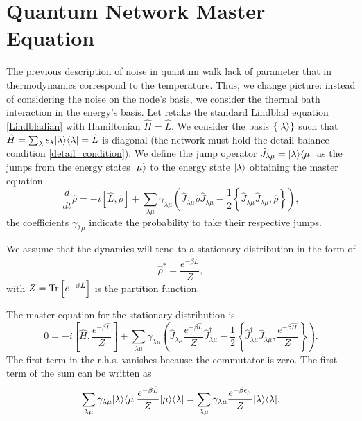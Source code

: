 \section{Quantum Network Master Equation}

The previous description of noise in quantum walk lack of parameter that in thermodynamics correspond to the temperature. 
Thus, we change picture: instead of considering the noise on the node's basis, we consider the thermal bath interaction in the energy's basis.
Let retake the standard Lindblad equation \eqref{Lindbladian} with Hamiltonian $\hat H = \hat L$.
We consider the basis $\{\lvert\lambda\rangle\}$ such that $\hat H = \sum_\lambda \epsilon_\lambda\lvert\lambda\rangle\langle\lambda\rvert = \hat L$ is diagonal (the network must hold the detail balance condition \eqref{detail_condition}).
We define the jump operator $\hat J_{\lambda\mu} = \lvert\lambda\rangle\langle\mu\rvert$ as the jumps from the energy states $\lvert\mu\rangle$ to the energy state $\lvert\lambda\rangle$ obtaining the master equation
\begin{equation}\label{Lindblad_energy_jump}
    \frac{d}{dt}\hat\rho = -i\left[\hat L,\hat\rho\right] + \sum_{\lambda\mu} \gamma_{\lambda\mu} \left(\hat J_{\lambda\mu} \hat\rho \hat J^\dagger_{\lambda\mu} - \frac{1}{2}\left\{ \hat J^\dagger_{\lambda\mu}\hat J_{\lambda\mu}, \hat\rho\right\} \right),
\end{equation}
the coefficients $\gamma_{\lambda\mu}$ indicate the probability to take their respective jumps.

We assume that the dynamics will tend to a stationary distribution in the form of
\begin{equation}\label{pretended_stationary_distribution}
    \hat \rho^* = \frac{e^{-\beta\hat L}}{Z},
\end{equation}
with $Z = \operatorname{Tr}\left[e^{-\beta\hat L}\right]$ is the partition function.

The master equation for the stationary distribution is
\begin{equation}\label{cancel_master_equation}
    0 = -i\left[\hat H, \frac{e^{-\beta\hat L}}{Z}\right] + \sum_{\lambda\mu} \gamma_{\lambda\mu} \left(\hat J_{\lambda\mu}  \frac{e^{-\beta\hat L}}{Z} \hat J^\dagger_{\lambda\mu} - \frac{1}{2}\left\{ \hat J^\dagger_{\lambda\mu}\hat J_{\lambda\mu},  \frac{e^{-\beta\hat H}}{Z}\right\} \right).
\end{equation}
The first term in the r.h.s. vanishes because the commutator is zero. 
The first term of the sum can be written as 
\begin{equation}
        \sum_{\lambda\mu} \gamma_{\lambda\mu} \lvert\lambda\rangle\langle\mu\rvert\frac{e^{-\beta\hat L}}{Z} \lvert\mu\rangle\langle\lambda\rvert = 
        \sum_{\lambda\mu} \gamma_{\lambda\mu} \frac{e^{-\beta \epsilon_\mu}}{Z} \lvert\lambda\rangle\langle\lambda\rvert.
\end{equation}

